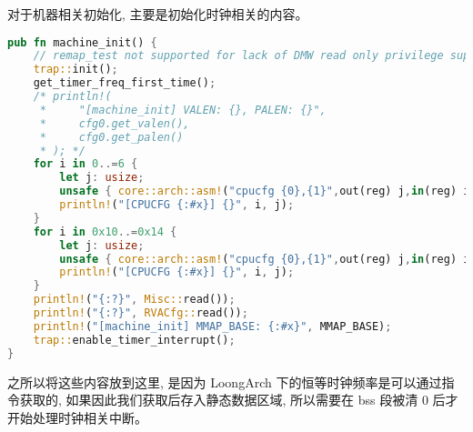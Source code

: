 对于机器相关初始化, 主要是初始化时钟相关的内容。
\begin{lstlisting}[language={rust}, label={code:refill},
	caption={os/src/arch/la64/mod.rs - machine\_init}]
    pub fn machine_init() {
    // remap_test not supported for lack of DMW read only privilege support
    trap::init();
    get_timer_freq_first_time();
    /* println!(
     *     "[machine_init] VALEN: {}, PALEN: {}",
     *     cfg0.get_valen(),
     *     cfg0.get_palen()
     * ); */
    for i in 0..=6 {
        let j: usize;
        unsafe { core::arch::asm!("cpucfg {0},{1}",out(reg) j,in(reg) i) };
        println!("[CPUCFG {:#x}] {}", i, j);
    }
    for i in 0x10..=0x14 {
        let j: usize;
        unsafe { core::arch::asm!("cpucfg {0},{1}",out(reg) j,in(reg) i) };
        println!("[CPUCFG {:#x}] {}", i, j);
    }
    println!("{:?}", Misc::read());
    println!("{:?}", RVACfg::read());
    println!("[machine_init] MMAP_BASE: {:#x}", MMAP_BASE);
    trap::enable_timer_interrupt();
}
\end{lstlisting}
之所以将这些内容放到这里, 是因为 LoongArch 下的恒等时钟频率是可以通过指令获取的, 
如果因此我们获取后存入静态数据区域, 所以需要在
bss 段被清 0 后才开始处理时钟相关中断。
